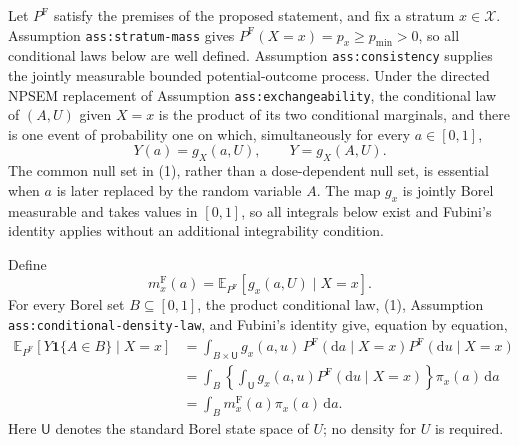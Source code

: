 Let \(P^{\mathrm F}\) satisfy the premises of the proposed statement, and fix a stratum \(x\in\mathcal X\).  Assumption \texttt{ass:stratum-mass} gives \(P^{\mathrm F}(X=x)=p_x\geq p_{\min}>0\), so all conditional laws below are well defined.  Assumption \texttt{ass:consistency} supplies the jointly measurable bounded potential-outcome process.  Under the directed NPSEM replacement of Assumption \texttt{ass:exchangeability}, the conditional law of \((A,U)\) given \(X=x\) is the product of its two conditional marginals, and there is one event of probability one on which, simultaneously for every \(a\in[0,1]\),
\[
 Y(a)=g_X(a,U),
 \qquad
 Y=g_X(A,U).
 \tag{1}
\]
The common null set in (1), rather than a dose-dependent null set, is essential when \(a\) is later replaced by the random variable \(A\).  The map \(g_x\) is jointly Borel measurable and takes values in \([0,1]\), so all integrals below exist and Fubini's identity applies without an additional integrability condition.

Define
\[
 m_x^{\mathrm F}(a)
 =\mathbb E_{P^{\mathrm F}}[g_x(a,U)\mid X=x].
 \tag{2}
\]
For every Borel set \(B\subseteq[0,1]\), the product conditional law, (1), Assumption \texttt{ass:conditional-density-law}, and Fubini's identity give, equation by equation,
\[
\begin{aligned}
 \mathbb E_{P^{\mathrm F}}[Y\mathbf 1\{A\in B\}\mid X=x]
 &=\int_{B\times\mathsf U}g_x(a,u)\,
     P^{\mathrm F}(\mathrm da\mid X=x)
     P^{\mathrm F}(\mathrm du\mid X=x)\\
 &=\int_B\left\{\int_{\mathsf U}g_x(a,u)
     P^{\mathrm F}(\mathrm du\mid X=x)\right\}\pi_x(a)\,\mathrm da\\
 &=\int_Bm_x^{\mathrm F}(a)\pi_x(a)\,\mathrm da.
\end{aligned}
\tag{3}
\]
Here \(\mathsf U\) denotes the standard Borel state space of \(U\); no density for \(U\) is required.

